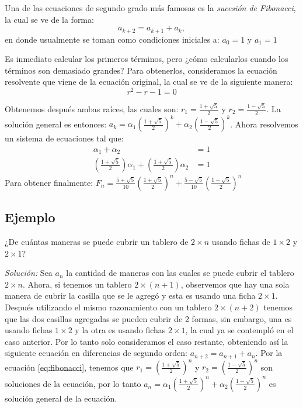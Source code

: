 \documentclass{report}
\begin{document}
Una de las ecuaciones de segundo grado más famosas es la \textit{sucesión de
  Fibonacci}, la cual se ve de la forma:
\begin{equation}
  \label{eq:fibonacci}
a_{k+2}=a_{k+1}+a_{k},  
\end{equation}
en donde usualmente se toman como condiciones iniciales a: $a_{0}=1$ y $a_{1}=1$

Es inmediato calcular los primeros términos, pero ¿cómo calcularlos
cuando los términos son demasiado grandes?  Para obtenerlos,
consideramos la ecuación resolvente que viene de la ecuación original,
la cual se ve de la siguiente manera:
$$r^2-r-1=0$$

Obtenemos después ambas raíces, las cuales son:
$r_{1}= \frac{1+\sqrt{5}}{2}$ y $r_{2}=\frac{1-\sqrt{5}}{2}$. La
solución general es entonces:
$a_{k}=\alpha_{1}(\frac{1+\sqrt{5}}{2})^{k} +
\alpha_{2}(\frac{1-\sqrt{5}}{2})^k$.
Ahora resolvemos un sistema de ecuaciones tal que:
\begin{align*}
\alpha_{1} + \alpha_{2} &= 1\\
(\frac{1+\sqrt{5}}{2})\alpha_{1} + (\frac{1+\sqrt{5}}{2})\alpha_{2}&=1
\end{align*}
Para obtener finalmente:
$F_{n}= \frac{5+\sqrt{5}}{10}(\frac{1+\sqrt{5}}{2})^n +
\frac{5-\sqrt{5}}{10}(\frac{1-\sqrt{5}}{2})^n$

\subsection{Ejemplo}
\label{sec:fichas}

¿De cuántas maneras se puede cubrir un tablero de $2\times n$ usando
fichas de $1\times 2$ y $2\times 1$?

\textit{Solución:} Sea $a_n$ la cantidad de maneras con las cuales se
puede cubrir el tablero $2\times n$. Ahora, si tenemos un tablero
$2\times (n+1)$, observemos que hay una sola manera de cubrir la
casilla que se le agregó y esta es usando una ficha $2\times 1$.
Después utilizando el mismo razonamiento con un tablero
$2\times (n+2)$ tenemos que las dos casillas agregadas se pueden
cubrir de 2 formas, sin embargo, una es usando fichas $1\times 2$ y la
otra es usando fichas $2\times 1$, la cual ya se contempló en el caso
anterior. Por lo tanto solo consideramos el caso restante, obteniendo
así la siguiente ecuación en diferencias de segundo orden:
$a_{n+2}=a_{n+1}+a_n$. Por la ecuación \eqref{eq:fibonacci}, tenemos
que $r_1=(\frac{1+\sqrt{5}}{2})^n$ y $r_2=(\frac{1-\sqrt{5}}{2})^n$
son soluciones de la ecuación, por lo tanto
$a_n=\alpha_1(\frac{1+\sqrt{5}}{2})^n +
\alpha_2(\frac{1-\sqrt{5}}{2})^n$ es solución general de la ecuación.
\end{document}
